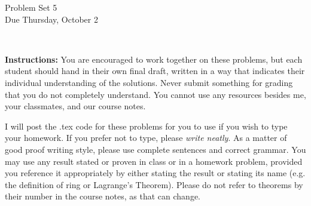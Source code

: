 \documentclass[11pt]{article}
\title{}
\date{\vspace{-0.5in}}
\theoremstyle{definition}
\begin{document}
\thispagestyle{fancy}
\pagestyle{fancy}

\vspace{3em}

\begin{center}
	{\LARGE Problem Set 5 \\}
	Due Thursday, October 2
\end{center}

\

\noindent
{\bf Instructions:}
You are encouraged to work together on these problems, but each student should hand in their own final draft, written in a way that indicates their individual understanding of the solutions. Never submit something for grading that you do not completely understand. You cannot use any resources besides me, your classmates, and our course notes.


I will post the .tex code for these problems for you to use if you wish to type your homework. If you prefer not to type, please  {\em write neatly}. As a matter of good proof writing style, please use complete sentences and correct grammar. You may use any result stated or proven in class or in a homework problem, provided you reference it appropriately by either stating the result or stating its name (e.g. the definition of ring or Lagrange's Theorem). Please do not refer to theorems by their number in the course notes, as that can change.


\smallskip
\end{document}

